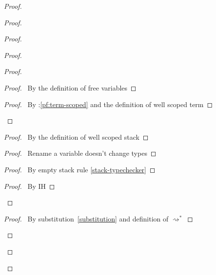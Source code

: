 \documentclass[a4paper]{article}
\begin{document}
\begin{proof}
\begin{proof}
\begin{proof}
      \begin{proof}
        \begin{proof}
          \begin{proof}
            \pf\ By the definition of free variables
          \end{proof}
          \qedstep
          \begin{proof}
            \pf\ By \toplevel:\ref{pf:term-scoped} and the definition of well scoped term
          \end{proof}
        \end{proof}
        \begin{proof}
          \pf\ By the definition of well scoped stack
        \end{proof}
        \begin{proof}
          \pf\ Rename a variable doesn't change types
        \end{proof}
        \begin{proof}
          \pf\ By empty stack rule \ref{stack-typechecker}
        \end{proof}
        \qedstep
        \begin{proof}
          \pf\ By IH
        \end{proof}
      \end{proof}
      \begin{proof}
        \pf\ By substitution~\ref{substitution} and definition of $\rightsquigarrow^*$
      \end{proof}
    \end{proof}
  \end{proof}

\end{proof}
\end{document}
